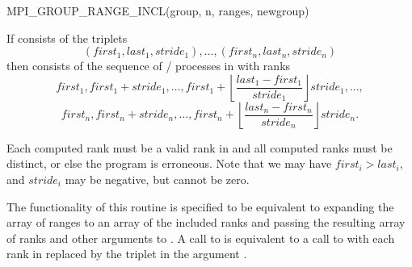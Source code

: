 %
\begin{funcdef}{MPI\_GROUP\_RANGE\_INCL}{(\mbox{group}, \mbox{n}, \mbox{ranges}, \mbox{newgroup})}
\end{funcdef}

\noindent If  consists of the triplets
\[
(first_1 , last_1, stride_1) , \ldots , (first_n, last_n, stride_n)
\]
then  consists of the sequence of
\MPI/ processes in  with ranks
\[
first_1 , first_1 + stride_1 , \ldots , first_1 + \left\lfloor \frac{last_1 -
first_1}{stride_1} \right\rfloor stride_1 , \ldots,
\]
\[
first_n , first_n + stride_n , \ldots , first_n + \left\lfloor \frac{last_n -
first_n}{stride_n} \right\rfloor stride_n .
\]

Each computed rank must be a valid
rank in  and all computed ranks must be distinct, or else the
program is erroneous.
Note that we may have $first_i > last_i$, and $stride_i$ may be negative, but
cannot be zero.

The functionality of this routine is specified to be equivalent to
expanding the array of ranges to an array of the included ranks and
passing the resulting array of ranks and other arguments to
. A call to  is
equivalent to a call to
 with each rank 
in  replaced by the triplet  in the argument .


